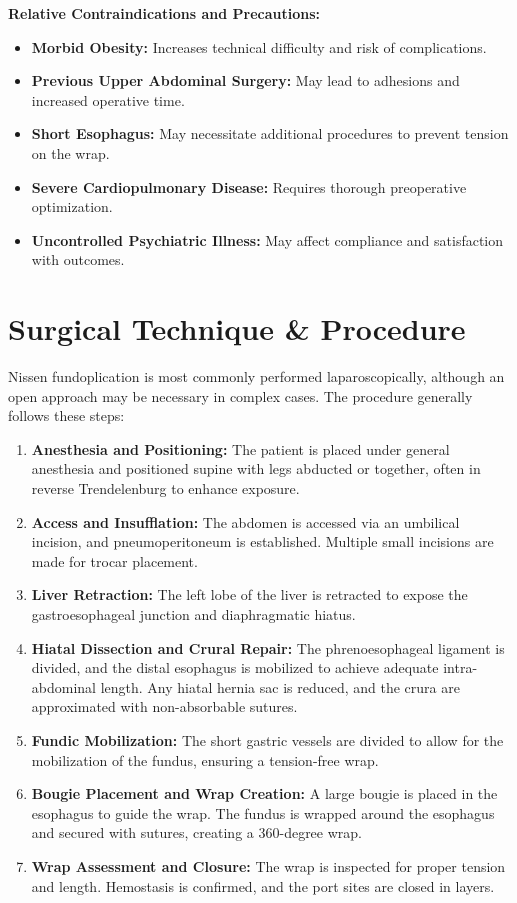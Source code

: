 \textbf{Relative Contraindications and Precautions:}
\begin{itemize}
  \item \textbf{Morbid Obesity:} Increases technical difficulty and risk of complications.
  \item \textbf{Previous Upper Abdominal Surgery:} May lead to adhesions and increased operative time.
  \item \textbf{Short Esophagus:} May necessitate additional procedures to prevent tension on the wrap.
  \item \textbf{Severe Cardiopulmonary Disease:} Requires thorough preoperative optimization.
  \item \textbf{Uncontrolled Psychiatric Illness:} May affect compliance and satisfaction with outcomes.
\end{itemize}

\section*{Surgical Technique \& Procedure}
Nissen fundoplication is most commonly performed laparoscopically, although an open approach may be necessary in complex cases. The procedure generally follows these steps:

\begin{enumerate}
  \item \textbf{Anesthesia and Positioning:} The patient is placed under general anesthesia and positioned supine with legs abducted or together, often in reverse Trendelenburg to enhance exposure.
  
  \item \textbf{Access and Insufflation:} The abdomen is accessed via an umbilical incision, and pneumoperitoneum is established. Multiple small incisions are made for trocar placement.

  \item \textbf{Liver Retraction:} The left lobe of the liver is retracted to expose the gastroesophageal junction and diaphragmatic hiatus.

  \item \textbf{Hiatal Dissection and Crural Repair:} The phrenoesophageal ligament is divided, and the distal esophagus is mobilized to achieve adequate intra-abdominal length. Any hiatal hernia sac is reduced, and the crura are approximated with non-absorbable sutures.

  \item \textbf{Fundic Mobilization:} The short gastric vessels are divided to allow for the mobilization of the fundus, ensuring a tension-free wrap.

  \item \textbf{Bougie Placement and Wrap Creation:} A large bougie is placed in the esophagus to guide the wrap. The fundus is wrapped around the esophagus and secured with sutures, creating a 360-degree wrap.

  \item \textbf{Wrap Assessment and Closure:} The wrap is inspected for proper tension and length. Hemostasis is confirmed, and the port sites are closed in layers.
\end{enumerate}

